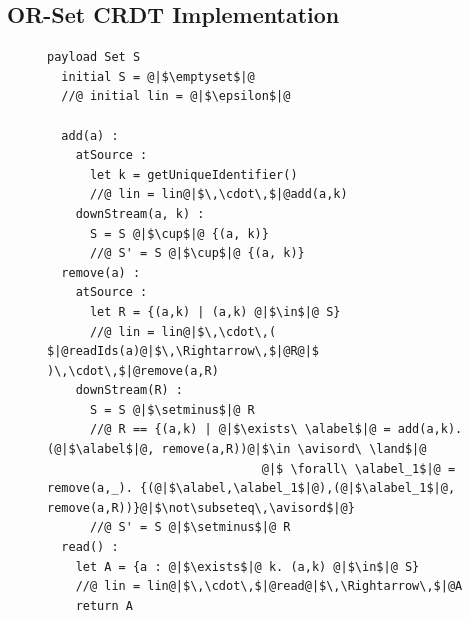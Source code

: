 

\subsection{OR-Set CRDT Implementation}
\label{sec:or-set-crdt}


\begin{figure}[!t]
  \centering
\begin{lstlisting}[caption={\vspace{-1mm}Pseudo-code of the OR-Set CRDT.},basicstyle=\ttfamily\scriptsize,captionpos=b,label={lst:or-set}]
  payload Set S
  initial S = @|$\emptyset$|@
  //@ initial lin = @|$\epsilon$|@

  add(a) :
    atSource :
      let k = getUniqueIdentifier()
      //@ lin = lin@|$\,\cdot\,$|@add(a,k)
    downStream(a, k) :
      S = S @|$\cup$|@ {(a, k)}
      //@ S' = S @|$\cup$|@ {(a, k)}
  remove(a) :
    atSource :
      let R = {(a,k) | (a,k) @|$\in$|@ S}
      //@ lin = lin@|$\,\cdot\,( $|@readIds(a)@|$\,\Rightarrow\,$|@R@|$ )\,\cdot\,$|@remove(a,R)
    downStream(R) :
      S = S @|$\setminus$|@ R
      //@ R == {(a,k) | @|$\exists\ \alabel$|@ = add(a,k). (@|$\alabel$|@, remove(a,R))@|$\in \avisord\ \land$|@
                              @|$ \forall\ \alabel_1$|@ = remove(a,_). {(@|$\alabel,\alabel_1$|@),(@|$\alabel_1$|@, remove(a,R))}@|$\not\subseteq\,\avisord$|@}
      //@ S' = S @|$\setminus$|@ R
  read() :
    let A = {a : @|$\exists$|@ k. (a,k) @|$\in$|@ S}
    //@ lin = lin@|$\,\cdot\,$|@read@|$\,\Rightarrow\,$|@A
    return A
\end{lstlisting}
\vspace{-5mm}
\end{figure}

